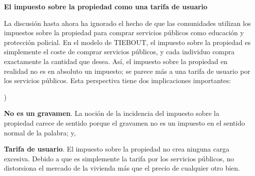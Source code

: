 \documentclass[10pt,a4paper]{article}
\newcounter{alphaitem}
\newenvironment{la}
      {\begin{list}{\alph{alphaitem})}{%
          \usecounter{alphaitem}%
          \setlength{\leftmargin}{1cm}%
          \setlength{\parskip}{3pt}%
          \setlength{\itemsep}{0pt}%
          \setlength{\parsep}{0pt}%
      }}
      {\end{list}}
\begin{document}
\textbf{El impuesto sobre la propiedad como una tarifa de usuario}

La discusión hasta ahora ha ignorado el hecho de que las comunidades utilizan los impuestos sobre la propiedad para comprar servicios públicos como educación y protección policial. En el modelo de TIEBOUT, el impuesto sobre la propiedad es simplemente el coste de comprar servicios públicos, y cada individuo compra exactamente la cantidad que desea. Así, el impuesto sobre la propiedad en realidad no es en absoluto un impuesto; se parece más a una tarifa de usuario por los servicios públicos. Esta perspectiva tiene dos implicaciones importantes:
\begin{la}
    \item \textbf{No es un gravamen}. La noción de la incidencia del impuesto sobre la propiedad carece de sentido porque el gravamen no es un impuesto en el sentido normal de la palabra; y,
    \item \textbf{Tarifa de usuario}. El impuesto sobre la propiedad no crea ninguna carga excesiva. Debido a que es simplemente la tarifa por los servicios públicos, no distorsiona el mercado de la vivienda más que el precio de cualquier otro bien.
\end{la}
\end{document}

